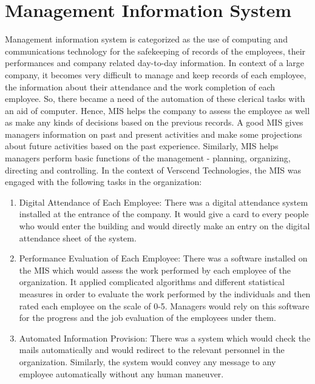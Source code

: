 \section{Management Information System}
Management information system is categorized as the use of computing and communications technology for
the safekeeping of records of the employees, their performances and company related day-to-day information.
In context of a large company, it becomes very difficult to manage and keep records of each employee, the
information about their attendance and the work completion of each employee. So, there became a need of
the automation of these clerical tasks with an aid of computer. Hence, MIS helps the company to assess the
employee as well as make any kinds of decisions based on the previous records. A good MIS gives managers
information on past and present activities and make some projections about future activities based on the past
experience. Similarly, MIS helps managers perform basic functions of the management - planning, organizing,
directing and controlling.
In the context of Verscend Technologies, the MIS was engaged with the following tasks in the
organization:
\begin{enumerate}
\item Digital Attendance of Each Employee: There was a digital attendance system installed at the entrance of
the company. It would give a card to every people who would enter the building and would directly make
an entry on the digital attendance sheet of the system.
\item Performance Evaluation of Each Employee: There was a software installed on the MIS which would
assess the work performed by each employee of the organization. It applied complicated algorithms and
different statistical measures in order to evaluate the work performed by the individuals and then rated each
employee on the scale of 0-5. Managers would rely on this software for the progress and the job evaluation
of the employees under them.
\item Automated Information Provision: There was a system which would check the mails automatically and
would redirect to the relevant personnel in the organization. Similarly, the system would convey any
message to any employee automatically without any human maneuver.
\end{enumerate}
\cleardoublepage
